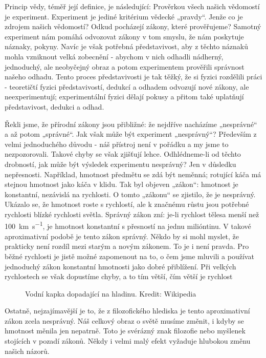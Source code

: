     Princip vědy, téměř její definice, je následující: Prověrkou všech našich vědomostí je 
    experiment. Experiment je jediné kritérium vědecké „pravdy“. Jenže co je zdrojem našich 
    vědomostí? Odkud pocházejí zákony, které prověřujeme? Samotný experiment nám pomáhá odvozovat 
    zákony v tom smyslu, že nám poskytuje náznaky, pokyny. Navíc je však potřebná představivost, 
    aby z těchto náznaků mohla vzniknout velká zobecnění - abychom v nich odhadli nádherný, 
    jednoduchý, ale neobyčejný obraz a potom experimentem prověřili správnost našeho odhadu. Tento
    proces představivosti je tak těžký, že si fyzici rozdělili práci - teoretičtí fyzici 
    představivostí, dedukcí a odhadem odvozují nové zákony, ale neexperimentují; experimentální 
    fyzici dělají pokusy a přitom také uplatňují představivost, dedukci a odhad.
    
    Řekli jsme, že přírodní zákony jsou přibližné: že nejdříve nacházíme „nesprávné“ a až potom
    „správné“. Jak však může být experiment „nesprávný“? Především z velmi jednoduchého důvodu - náš
    přístroj není v pořádku a my jsme to nezpozorovali. Takové chyby se však zjišťují lehce.
    Odhlédneme-li od těchto drobností, jak může být výsledek experimentu nesprávný? Jen v důsledku
    nepřesnosti. Například, hmotnost předmětu se zdá být neměnná; rotující káča má stejnou hmotnost
    jako káča v klidu. Tak byl objeven „zákon“: hmotnost je konstantní, nezávislá na rychlosti. O
    tomto „zákonu“ se zjistilo, že je nesprávný. Ukázalo se, že hmotnost roste s rychlostí, ale k
    značnému růstu jsou potřebné rychlosti blízké rychlosti světla. Správný zákon zní: je-li
    rychlost tělesa menší než \SI{100}{\km\per\second}, je hmotnost konstantní s přesností na jednu
    milióntinu. V takové aproximativní podobě je tento zákon správný. Někdo by si mohl myslet, že
    prakticky není rozdíl mezi starým a novým zákonem. To je i není pravda. Pro běžné rychlosti je
    jistě možné zapomenout na to, o čem jsme mluvili a používat jednoduchý zákon konstantní
    hmotnosti jako dobré přiblížení. Při velkých rychlostech se však dopustíme chyby, a to tím
    větší, čím větší je rychlost

    \begin{figure}[ht!]  %
      \centering
      \caption{Vodní kapka dopadající na hladinu. Kredit: Wikipedia}
      \label{fyz:fig891}
    \end{figure} 
    
    Ostatně, nejzajímavější je to, že z filozofického hlediska je tento aproximativní zákon zcela
    nesprávný. Náš celkový obraz o světě musíme změnit, i kdyby se hmotnost měnila jen nepatrně.
    Toto je svérázný znak filozofie nebo myšlenek stojících v pozadí zákonů. Někdy i velmi malý
    efekt vyžaduje hlubokou změnu našich názorů.
    

